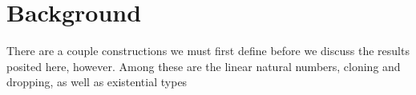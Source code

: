 \section{Background}

There are a couple constructions we must first define before we discuss the results posited here, however.
Among these are the linear natural numbers, cloning and dropping, as well as existential types